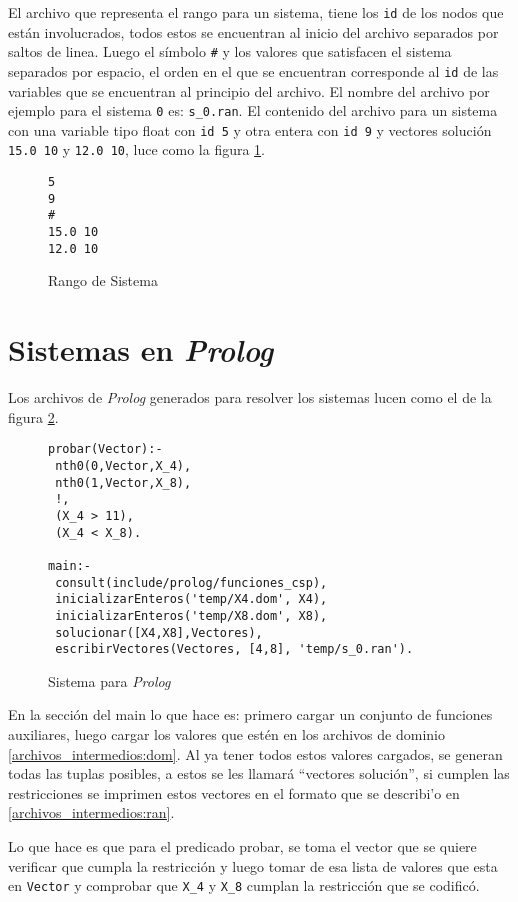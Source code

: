 \label{archivos_intermedios:ran}
El archivo que representa el rango para un sistema, tiene los \texttt{id} de los nodos
que están involucrados, todos estos se encuentran al inicio del archivo separados por saltos de linea. Luego el símbolo \texttt{\#} y los
valores que satisfacen el sistema separados por espacio, el orden en el que se encuentran
corresponde al \texttt{id} de las variables que se encuentran al principio del archivo. 
El nombre del archivo por ejemplo para el sistema \texttt{0} es: \texttt{s\_0.ran}. El contenido del 
archivo para un sistema con una variable tipo float con \texttt{id 5} y otra entera con 
\texttt{id 9} y vectores solución \texttt{15.0 10} y \texttt{12.0 10}, luce como la figura \ref{fig:ej_s}.

\begin{figure}[h]
\begin{lstlisting}[mathescape]
5
9
#
15.0 10
12.0 10
\end{lstlisting}
\caption[Rango de Sistema]
{Rango de Sistema}
\label{fig:ej_s}
\end{figure}

\section {Sistemas en \emph{Prolog}}
\label{archivos_intermedios:pl}

Los archivos de \emph{Prolog} generados para resolver los sistemas lucen como el de la figura 
\ref{fig:ej_pl}.

\begin{figure}[h]
\begin{lstlisting}[mathescape]
probar(Vector):-
 nth0(0,Vector,X_4),
 nth0(1,Vector,X_8),
 !,
 (X_4 > 11),
 (X_4 < X_8).

main:- 
 consult(include/prolog/funciones_csp),
 inicializarEnteros('temp/X4.dom', X4),
 inicializarEnteros('temp/X8.dom', X8),
 solucionar([X4,X8],Vectores),
 escribirVectores(Vectores, [4,8], 'temp/s_0.ran').
\end{lstlisting}
\caption[Sistema para \emph{Prolog}]
{Sistema para \emph{Prolog}}
\label{fig:ej_pl}
\end{figure}

En la sección del main lo que hace es: primero cargar un conjunto de funciones auxiliares,
luego cargar los valores que estén en los archivos de dominio \ref{archivos_intermedios:dom}.
Al ya tener todos estos valores cargados, se generan todas las tuplas posibles, a estos se les
llamará ``vectores solución'', si cumplen las restricciones se imprimen estos vectores en el
formato que se describi'o en \ref{archivos_intermedios:ran}.

Lo que hace es que para el predicado probar, se toma el vector que se quiere verificar que cumpla 
la restricción y luego tomar de esa lista de valores que esta en 
\texttt{Vector} y comprobar que \texttt{X\_4} y \texttt{X\_8} cumplan la restricción que se codificó.

